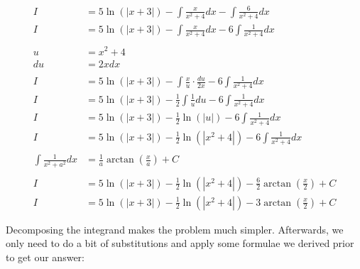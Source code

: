 \documentclass[12pt]{article}
\begin{document}
\begin{align}
    I                              & = 5\ln(|x+3|) - \int \frac{x}{x^2+4} dx - \int \frac{6}{x^2+4} dx                         \\
    I                              & = 5\ln(|x+3|) - \int \frac{x}{x^2+4} dx - 6\int \frac{1}{x^2+4} dx                        \\
    \nonumber                                                                                                                  \\
    u                              & = x^2+4                                                                                   \\
    du                             & = 2x dx                                                                                   \\
    \nonumber                                                                                                                  \\
    I                              & = 5\ln(|x+3|) - \int \frac{x}{u} \cdot \frac{du}{2x} - 6\int \frac{1}{x^2+4} dx           \\
    I                              & = 5\ln(|x+3|) - \frac{1}{2} \int \frac{1}{u} du - 6\int \frac{1}{x^2+4} dx                \\
    I                              & = 5\ln(|x+3|) - \frac{1}{2} \ln(|u|) - 6\int \frac{1}{x^2+4} dx                           \\
    I                              & = 5\ln(|x+3|) - \frac{1}{2} \ln(|x^2+4|) - 6\int \frac{1}{x^2+4} dx                       \\
    \nonumber                                                                                                                  \\
    \int \frac{1}{x^2+a^2} dx      & = \frac{1}{a}\arctan\left(\frac{x}{a}\right) + C                                          \\
    \nonumber                                                                                                                  \\
    I                              & = 5\ln(|x+3|) - \frac{1}{2} \ln(|x^2+4|) - \frac{6}{2}\arctan\left(\frac{x}{2}\right) + C \\
    I                              & = 5\ln(|x+3|) - \frac{1}{2} \ln(|x^2+4|) - 3\arctan\left(\frac{x}{2}\right) + C
\end{align}


Decomposing the integrand makes the problem much simpler.
Afterwards, we only need to do a bit of substitutions and apply some formulae we derived prior to get our answer:
\end{document}
